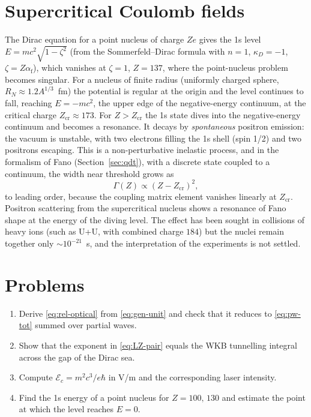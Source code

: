\documentclass[11pt,a4paper]{book}
\numberwithin{equation}{chapter}
\newcommand{\afs}{\alpha_{\mathrm{f}}}
\begin{document}
\section{Supercritical Coulomb fields}\label{sec:supercrit}

The Dirac equation for a point nucleus of charge $Ze$ gives the 1s level
$E=mc^2\sqrt{1-\zeta^2}$ (from the Sommerfeld--Dirac formula with
$n=1$, $\kappa_D=-1$, $\zeta=Z\afs$), which vanishes at $\zeta=1$,
$Z=137$, where the point-nucleus problem becomes singular. For a nucleus of finite
radius (uniformly charged sphere, $R_N\approx1.2A^{1/3}$~fm) the potential is
regular at the origin and the level continues to fall, reaching
$E=-mc^2$, the upper edge of the negative-energy continuum, at the critical
charge $Z_{\mathrm{cr}}\approx173$. For $Z>Z_{\mathrm{cr}}$ the 1s state dives
into the negative-energy continuum and becomes a resonance. It decays by
\emph{spontaneous} positron emission: the vacuum is unstable, with two electrons
filling the 1s shell (spin 1/2) and two positrons escaping. This is a
non-perturbative inelastic process, and in the formalism of Fano
(Section~\ref{sec:qdt}), with a discrete state coupled to a continuum, the width
near threshold grows as
\begin{equation}
  \Gamma(Z)\propto(Z-Z_{\mathrm{cr}})^2,
\end{equation}
to leading order, because the coupling matrix element vanishes linearly at
$Z_{\mathrm{cr}}$. Positron scattering from the supercritical nucleus shows a
resonance of Fano shape at the energy of the diving level. The effect has been
sought in collisions of heavy ions (such as U+U, with combined charge $184$) but
the nuclei remain together only $\sim10^{-21}$~s, and the interpretation of the
experiments is not settled.

\section{Problems}
\begin{enumerate}
  \item Derive \eqref{eq:rel-optical} from \eqref{eq:gen-unit} and check that it
        reduces to \eqref{eq:pw-tot} summed over partial waves.
  \item Show that the exponent in \eqref{eq:LZ-pair} equals the WKB tunnelling
        integral across the gap of the Dirac sea.
  \item Compute $\mathcal E_c=m^2c^3/e\hbar$ in V/m and the corresponding laser
        intensity.
  \item Find the 1s energy of a point nucleus for $Z=100,\,130$ and estimate the
        point at which the level reaches $E=0$.
\end{enumerate}
\end{document}
